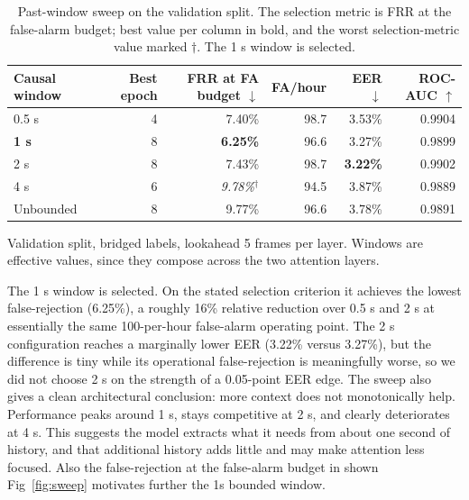 \documentclass{article}
\begin{document}
\begin{table}[H]
    \centering
    \caption{Past-window sweep on the validation split. The selection metric is FRR at the false-alarm budget; best value per column in bold, and the worst selection-metric value marked $\dagger$. The 1 s window is selected.}
    \label{tab:sweep}
    \setlength{\tabcolsep}{3pt}
    \small
    \begin{tabular}{lrrrrr}
        \toprule
        Causal window & Best epoch & FRR at FA budget $\downarrow$ & FA/hour & EER $\downarrow$ & ROC-AUC $\uparrow$ \\
        \midrule
        0.5 s          & 4 & 7.40\%                     & 98.7 & 3.53\%          & 0.9904 \\
        \textbf{1 s}   & 8 & \textbf{6.25\%}            & 96.6 & 3.27\%          & 0.9899 \\
        2 s            & 8 & 7.43\%                     & 98.7 & \textbf{3.22\%} & 0.9902 \\
        4 s            & 6 & \textit{9.78\%}$^{\dagger}$& 94.5 & 3.87\%          & 0.9889 \\
        \midrule
        Unbounded      & 8 & 9.77\%                     & 96.6 & 3.78\%          & 0.9891 \\
        \bottomrule
    \end{tabular}
\end{table}

Validation split, bridged labels, lookahead 5 frames per layer. Windows are effective values, since they compose across the two attention layers.

The 1 s window is selected. On the stated selection criterion it achieves the lowest false-rejection (6.25\%), a roughly 16\% relative reduction over 0.5 s and 2 s at essentially the same 100-per-hour false-alarm operating point. The 2 s configuration reaches a marginally lower EER (3.22\% versus 3.27\%), but the difference is tiny while its operational false-rejection is meaningfully worse, so we did not choose 2 s on the strength of a 0.05-point EER edge. The sweep also gives a clean architectural conclusion: more context does not monotonically help. Performance peaks around 1 s, stays competitive at 2 s, and clearly deteriorates at 4 s. This suggests the model extracts what it needs from about one second of history, and that additional history adds little and may make attention less focused. Also the false-rejection at the false-alarm budget in shown Fig~\ref{fig:sweep} motivates further the 1s bounded window.
\end{document}
